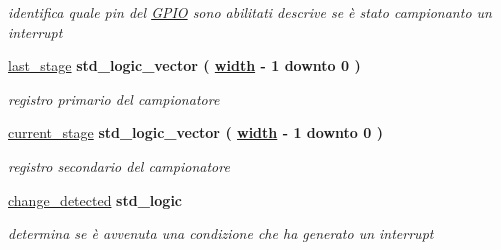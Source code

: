 \begin{DoxyCompactItemize}
\begin{DoxyCompactList}\small\item\em identifica quale pin del \hyperlink{structGPIO}{G\+P\+IO} sono abilitati descrive se è stato campionanto un interrupt \end{DoxyCompactList}\item 
\mbox{\label{classGPIO__v1__0__S00__AXI_1_1arch__imp_abbf01ed939d4259b9f5cd1da3bf8c81d}} 
\hyperlink{classGPIO__v1__0__S00__AXI_1_1arch__imp_abbf01ed939d4259b9f5cd1da3bf8c81d}{last\+\_\+stage} {\bfseries \textcolor{vhdlchar}{std\+\_\+logic\+\_\+vector}\textcolor{vhdlchar}{ }\textcolor{vhdlchar}{(}\textcolor{vhdlchar}{ }\textcolor{vhdlchar}{ }\textcolor{vhdlchar}{ }\textcolor{vhdlchar}{ }{\bfseries \hyperlink{classGPIO__v1__0__S00__AXI_a16bbf9205afa677edb8a74dcd39ebb9f}{width}} \textcolor{vhdlchar}{-\/}\textcolor{vhdlchar}{ } \textcolor{vhdldigit}{1} \textcolor{vhdlchar}{ }\textcolor{vhdlchar}{downto}\textcolor{vhdlchar}{ }\textcolor{vhdlchar}{ } \textcolor{vhdldigit}{0} \textcolor{vhdlchar}{ }\textcolor{vhdlchar}{)}\textcolor{vhdlchar}{ }} 
\begin{DoxyCompactList}\small\item\em registro primario del campionatore \end{DoxyCompactList}\item 
\mbox{\label{classGPIO__v1__0__S00__AXI_1_1arch__imp_a0d3a1f6396a5b16ea1ae6e06e9af061e}} 
\hyperlink{classGPIO__v1__0__S00__AXI_1_1arch__imp_a0d3a1f6396a5b16ea1ae6e06e9af061e}{current\+\_\+stage} {\bfseries \textcolor{vhdlchar}{std\+\_\+logic\+\_\+vector}\textcolor{vhdlchar}{ }\textcolor{vhdlchar}{(}\textcolor{vhdlchar}{ }\textcolor{vhdlchar}{ }\textcolor{vhdlchar}{ }\textcolor{vhdlchar}{ }{\bfseries \hyperlink{classGPIO__v1__0__S00__AXI_a16bbf9205afa677edb8a74dcd39ebb9f}{width}} \textcolor{vhdlchar}{-\/}\textcolor{vhdlchar}{ } \textcolor{vhdldigit}{1} \textcolor{vhdlchar}{ }\textcolor{vhdlchar}{downto}\textcolor{vhdlchar}{ }\textcolor{vhdlchar}{ } \textcolor{vhdldigit}{0} \textcolor{vhdlchar}{ }\textcolor{vhdlchar}{)}\textcolor{vhdlchar}{ }} 
\begin{DoxyCompactList}\small\item\em registro secondario del campionatore \end{DoxyCompactList}\item 
\mbox{\label{classGPIO__v1__0__S00__AXI_1_1arch__imp_aab51abc2eb680c6f972e0d63ab4fc591}} 
\hyperlink{classGPIO__v1__0__S00__AXI_1_1arch__imp_aab51abc2eb680c6f972e0d63ab4fc591}{change\+\_\+detected} {\bfseries \textcolor{vhdlchar}{std\+\_\+logic}\textcolor{vhdlchar}{ }} 
\begin{DoxyCompactList}\small\item\em determina se è avvenuta una condizione che ha generato un interrupt \end{DoxyCompactList}\end{DoxyCompactItemize}
